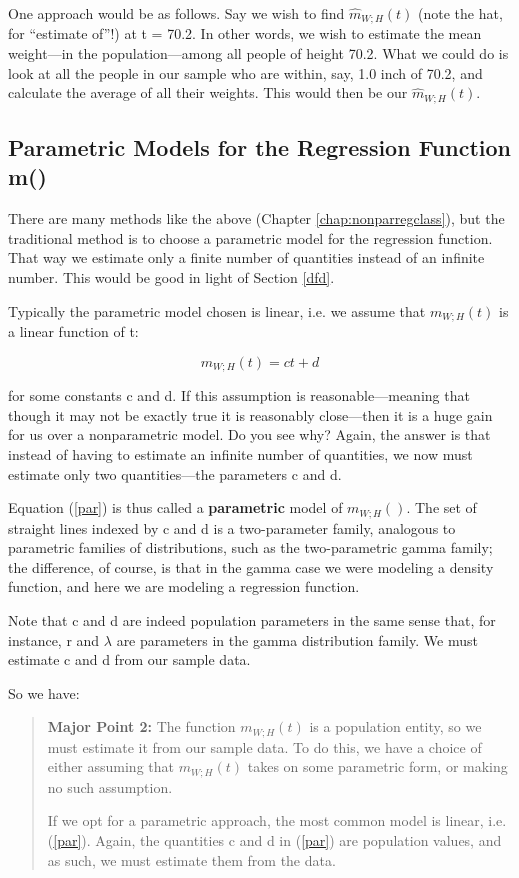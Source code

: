 One approach would be as follows.  Say we wish to find
$\widehat{m}_{W;H}(t)$ (note the hat, for ``estimate of''!) at t = 70.2.
In other words, we wish to estimate the mean weight---in the
population---among all people of height 70.2.  What we could do is look
at all the people in our sample who are within, say, 1.0 inch of 70.2,
and calculate the average of all their weights.  This would then be our
$\widehat{m}_{W;H}(t)$. 

\subsection{Parametric Models for the Regression Function m()}

There are many methods like the above (Chapter \ref{chap:nonparregclass}),
but the traditional method is to choose a parametric model for the
regression function.  That way we estimate only a finite number of
quantities instead of an infinite number.  This would be good in light
of Section \ref{dfd}.

Typically the parametric model chosen is linear, i.e.  we assume that
$m_{W;H}(t)$ is a linear function of t:

\begin{equation}
\label{par}
m_{W;H}(t) = ct+d
\end{equation}

for some constants c and d.  If this assumption is reasonable---meaning
that though it may not be exactly true it is reasonably close---then it
is a huge gain for us over a nonparametric model.  Do you see why?
Again, the answer is that instead of having to estimate an infinite
number of quantities, we now must estimate only two quantities---the
parameters c and d.

Equation (\ref{par}) is thus called a {\bf parametric} model of
$m_{W;H}()$.  The set of straight lines indexed by c and d is a
two-parameter family, analogous to parametric families of distributions,
such as the two-parametric gamma family; the difference, of course, is
that in the gamma case we were modeling a density function, and here we
are modeling a regression function.

Note that c and d are indeed population parameters in the same sense
that, for instance, r and $\lambda$ are parameters in the gamma
distribution family.  We must estimate c and d from our sample data.

So we have:

\begin{quote}
{\bf Major Point 2:}  The function $m_{W;H}(t)$ is a population entity,
so we must estimate it from our sample data.  To do this, we have a 
choice of either assuming that $m_{W;H}(t)$ takes on some parametric 
form, or making no such assumption.

If we opt for a parametric approach, the most common model is linear,
i.e. (\ref{par}).  Again, the quantities c and d in (\ref{par}) are
population values, and as such, we must estimate them from the data.

\end{quote}

